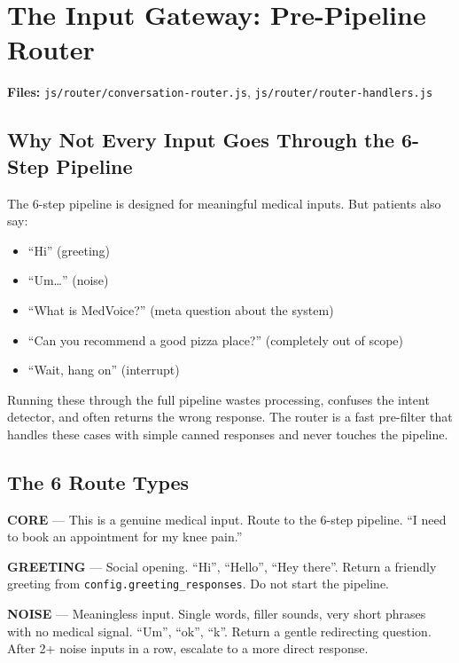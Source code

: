 \documentclass[12pt, a4paper]{report}
\newcommand{\ic}[1]{\texttt{\small\color{accentblue!70!black}#1}}
\begin{document}
\chapter{The Input Gateway: Pre-Pipeline Router}

\textbf{Files:} \ic{js/router/conversation-router.js}, \ic{js/router/router-handlers.js}

\section{Why Not Every Input Goes Through the 6-Step Pipeline}

The 6-step pipeline is designed for meaningful medical inputs. But patients also say:

\begin{itemize}
  \item ``Hi'' (greeting)
  \item ``Um\ldots'' (noise)
  \item ``What is MedVoice?'' (meta question about the system)
  \item ``Can you recommend a good pizza place?'' (completely out of scope)
  \item ``Wait, hang on'' (interrupt)
\end{itemize}

Running these through the full pipeline wastes processing, confuses the intent detector,
and often returns the wrong response. The router is a fast pre-filter that handles these
cases with simple canned responses and never touches the pipeline.

\section{The 6 Route Types}

\textbf{CORE} --- This is a genuine medical input. Route to the 6-step pipeline.
``I need to book an appointment for my knee pain.''

\textbf{GREETING} --- Social opening. ``Hi'', ``Hello'', ``Hey there''. Return a
friendly greeting from \ic{config.greeting\_responses}. Do not start the pipeline.

\textbf{NOISE} --- Meaningless input. Single words, filler sounds, very short phrases
with no medical signal. ``Um'', ``ok'', ``k''. Return a gentle redirecting question.
After 2+ noise inputs in a row, escalate to a more direct response.
\end{document}
